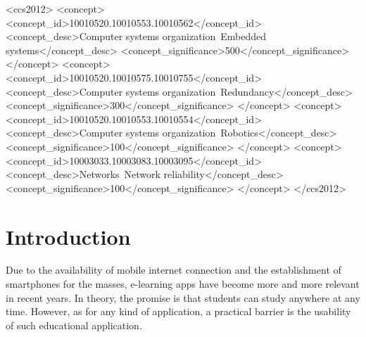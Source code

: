 \documentclass{sig-alternate-05-2015}
\begin{document}
%
%
\begin{CCSXML}
<ccs2012>
 <concept>
  <concept_id>10010520.10010553.10010562</concept_id>
  <concept_desc>Computer systems organization~Embedded systems</concept_desc>
  <concept_significance>500</concept_significance>
 </concept>
 <concept>
  <concept_id>10010520.10010575.10010755</concept_id>
  <concept_desc>Computer systems organization~Redundancy</concept_desc>
  <concept_significance>300</concept_significance>
 </concept>
 <concept>
  <concept_id>10010520.10010553.10010554</concept_id>
  <concept_desc>Computer systems organization~Robotics</concept_desc>
  <concept_significance>100</concept_significance>
 </concept>
 <concept>
  <concept_id>10003033.10003083.10003095</concept_id>
  <concept_desc>Networks~Network reliability</concept_desc>
  <concept_significance>100</concept_significance>
 </concept>
</ccs2012>
\end{CCSXML}
%
%
%
%
\printccsdesc
\section{Introduction}
Due to the availability of mobile internet connection and the establishment of smartphones for the masses, e-learning apps have become more and more relevant in recent years.
In theory, the promise is that students can study anywhere at any time. However, as for any kind of application, a practical barrier is the usability of such educational application.
\end{document}
